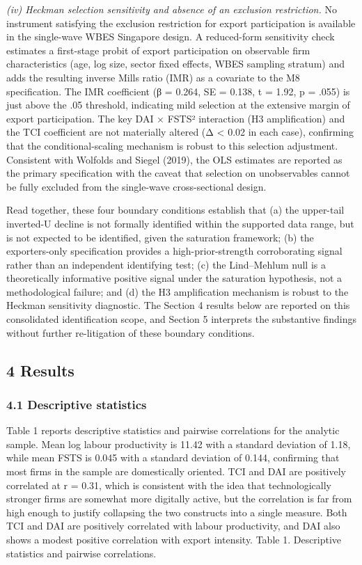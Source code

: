 \documentclass[
  12pt,a4paper]{article}
\begin{document}
\emph{(iv) Heckman selection sensitivity and absence of an exclusion
restriction.} No instrument satisfying the exclusion restriction for
export participation is available in the single-wave WBES Singapore
design. A reduced-form sensitivity check estimates a first-stage probit
of export participation on observable firm characteristics (age, log
size, sector fixed effects, WBES sampling stratum) and adds the
resulting inverse Mills ratio (IMR) as a covariate to the M8
specification. The IMR coefficient (β = 0.264, SE = 0.138, t = 1.92, p =
.055) is just above the .05 threshold, indicating mild selection at the
extensive margin of export participation. The key DAI × FSTS²
interaction (H3 amplification) and the TCI coefficient are not
materially altered (\textbar Δ\textbar{} \textless{} 0.02 in each case),
confirming that the conditional-scaling mechanism is robust to this
selection adjustment. Consistent with Wolfolds and Siegel (2019), the
OLS estimates are reported as the primary specification with the caveat
that selection on unobservables cannot be fully excluded from the
single-wave cross-sectional design.

Read together, these four boundary conditions establish that (a) the
upper-tail inverted-U decline is not formally identified within the
supported data range, but is not expected to be identified, given the
saturation framework; (b) the exporters-only specification provides a
high-prior-strength corroborating signal rather than an independent
identifying test; (c) the Lind--Mehlum null is a theoretically
informative positive signal under the saturation hypothesis, not a
methodological failure; and (d) the H3 amplification mechanism is robust
to the Heckman sensitivity diagnostic. The Section 4 results below are
reported on this consolidated identification scope, and Section 5
interprets the substantive findings without further re-litigation of
these boundary conditions.

\hypertarget{results}{%
\subsection{4 Results}\label{results}}

\hypertarget{descriptive-statistics}{%
\subsubsection{4.1 Descriptive
statistics}\label{descriptive-statistics}}

Table 1 reports descriptive statistics and pairwise correlations for the
analytic sample. Mean log labour productivity is 11.42 with a standard
deviation of 1.18, while mean FSTS is 0.045 with a standard deviation of
0.144, confirming that most firms in the sample are domestically
oriented. TCI and DAI are positively correlated at r = 0.31, which is
consistent with the idea that technologically stronger firms are
somewhat more digitally active, but the correlation is far from high
enough to justify collapsing the two constructs into a single measure.
Both TCI and DAI are positively correlated with labour productivity, and
DAI also shows a modest positive correlation with export intensity.
Table 1. Descriptive statistics and pairwise correlations.
\end{document}
